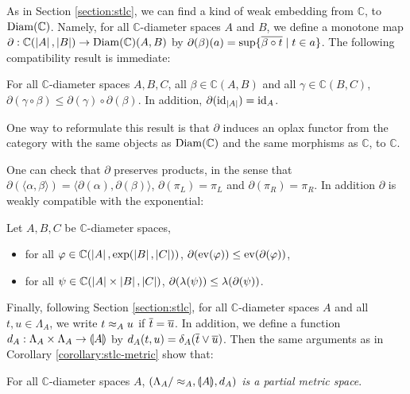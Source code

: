 As in Section \ref{section:stlc}, we can find a kind of weak embedding from $\mathbb{C}$, to $\operatorname{Diam}(\mathbb{C})$. Namely, for all $\mathbb{C}$-diameter spaces $A$ and $B$, we define a monotone map $\partial : \mathbb{C}(\left\vert A\right\vert, \left\vert B\right\vert) \to \operatorname{Diam}\allowbreak(\mathbb{C})(A, B)$ by $\partial(\beta)(a) = \sup \{ \overline{\beta \circ t} \mid t \in a \}$. The following compatibility result is immediate:

\begin{proposition} For all $\mathbb{C}$-diameter spaces $A, B, C$, all $\beta \in \mathbb{C}(A, B)$ and all $\gamma \in \mathbb{C}(B, C)$, $\partial(\gamma \circ \beta) \leq \partial(\gamma) \circ \partial(\beta)$. In addition, $\partial(\operatorname{id}_{\left\vert A\right\vert}) = \operatorname{id}_A$.
\end{proposition}
 
One way to reformulate this result is that $\partial$ induces an oplax functor from the category with the same objects as $\operatorname{Diam}(\mathbb{C})$ and the same morphisms as $\mathbb{C}$, to $\mathbb{C}$.

One can check that $\partial$ preserves products, in the sense that $\partial (\langle \alpha, \beta \rangle) = \langle\partial(\alpha), \partial(\beta)\rangle$, $\partial(\pi_L) = \pi_L$ and $\partial(\pi_R) = \pi_R$. In addition $\partial$ is weakly compatible with the exponential:

\begin{proposition} Let $A, B, C$ be $\mathbb{C}$-diameter spaces, \begin{itemize}
\item for all $\varphi \in \mathbb{C}(\left\vert A\right\vert, \exp(\left\vert B\right\vert, \left\vert C\right\vert))$, $\partial(\operatorname{ev}(\varphi)) \leq \operatorname{ev}(\partial(\varphi))$,
\item for all $\psi \in \mathbb{C}(\left\vert A\right\vert\times\left\vert B\right\vert, \left\vert C\right\vert)$, $\partial(\lambda(\psi)) \leq \lambda(\partial(\psi))$.
\end{itemize}
\end{proposition}

Finally, following Section \ref{section:stlc}, for all $\mathbb{C}$-diameter spaces $A$ and all  $t,u \in \Lambda_A$, we write $t \approx_A u$ if $\overline{t} = \overline{u}$. In addition, we define a function $d_A : \Lambda_A \times \Lambda_A \to \llparenthesis A \rrparenthesis$ by $d_A(t,u) = \delta_A(\overline{t} \vee \overline{u})$. Then the same arguments as in Corollary \ref{corollary:stlc-metric} show that:

\begin{proposition} For all $\mathbb{C}$-diameter spaces $A$, \emph{$(\Lambda_{A}/\approx_{A}, \llparenthesis A \rrparenthesis, d_{A})$ is a partial metric space}.
\end{proposition}

